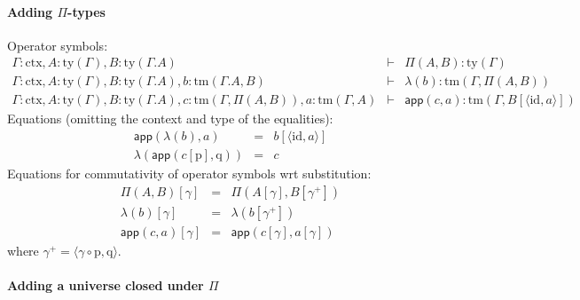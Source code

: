 \documentclass[11pt,a4paper]{article}
\theoremstyle{definition}
\newcommand{\id}{\mathsf{id}}
\newcommand{\app}[2]{{#1\,#2}} %
\def\id{\mathrm{id}}
\newcommand{\ctx}{\mathrm{ctx}}
\newcommand{\ty}{\mathrm{ty}}
\newcommand{\tm}{\mathrm{tm}}
\newcommand{\tuple}[1]{\langle #1 \rangle}
\def\p{\mathrm{p}}
\def\q{\mathrm{q}}
\def\app{\mathsf{app}}
\begin{document}
\paragraph{Adding $\Pi$-types}
\begin{tiny}
Operator symbols:
\begin{eqnarray*}
\Gamma : \ctx, A : \ty(\Gamma), B : \ty(\Gamma.A)&\vdash& \Pi(A,B) : \ty(\Gamma)\\
\Gamma : \ctx, A : \ty(\Gamma), B : \ty(\Gamma.A), b : \tm(\Gamma.A, B) &\vdash& \lambda(b) : \tm(\Gamma,\Pi(A,B))\\
\Gamma : \ctx, A : \ty(\Gamma), B : \ty(\Gamma.A), c :  \tm(\Gamma,\Pi(A,B)), a : \tm(\Gamma, A) &\vdash& \app(c,a) : \tm(\Gamma, B[\tuple{\id,a}])
\end{eqnarray*}
Equations (omitting the context and type of the equalities):
 \begin{eqnarray*}
 \app(\lambda(b),a) &=& b[\tuple{\id,a}]\\
 \lambda(\app(c[\p],\q)) &=& c
 \end{eqnarray*}
 Equations for commutativity of operator symbols wrt substitution:
 \begin{eqnarray*}
\Pi(A,B)[ \gamma ] &=& \Pi(A [ \gamma ], B[ \gamma^+ ])\\
\lambda(b) [ \gamma ] &=& \lambda(b[\gamma^+ ])\\
\app(c,a) [ \gamma ] &=& \app(c[ \gamma ], a[ \gamma ] )
\end{eqnarray*}
where $\gamma^+ = \tuple{\gamma \circ \p, \q}$.
\end{tiny}


\paragraph{Adding a universe closed under $\Pi$}
\end{document}
